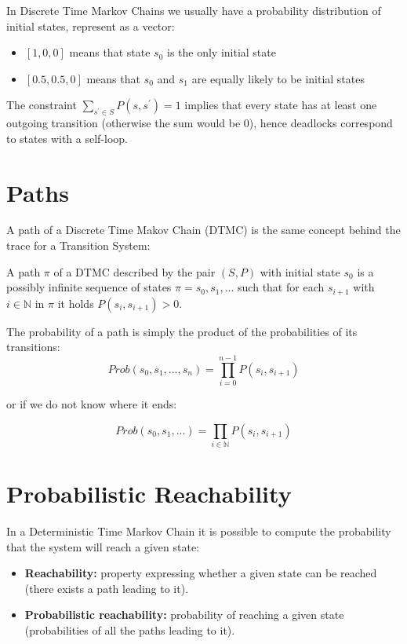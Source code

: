 In Discrete Time Markov Chains we usually have a probability distribution of initial states, represent as a vector:
\begin{itemize}
    \item $[1, 0, 0]$ means that state $s_0$ is the only initial state
    \item $[0.5, 0.5, 0]$ means that $s_{0}$ and $s_{1}$ are equally likely to be initial states
\end{itemize}

The constraint $\sum_{s^{'} \in S} P(s, s^{'}) = 1$ implies that every state has at least one outgoing transition (otherwise the sum would be 0), hence deadlocks correspond to states with a self-loop.

\section{Paths}
A path of a Discrete Time Makov Chain (DTMC) is the same concept behind the trace for a Transition System:\par
A path $\pi$ of a DTMC described by the pair $(S, P)$ with initial state $s_{0}$ is a possibly infinite sequence of states $\pi = s_{0}, s_{1}, ...$ such that for each $s_{i+1}$ with $i \in \mathbb{N}$ in $\pi$ it holds $P(s_{i}, s_{i+1}) > 0$.\par

The probability of a path is simply the product of the probabilities of its transitions:
\begin{equation*}
    Prob(s_{0}, s_{1}, ..., s_{n}) = \prod^{n-1}_{i=0} P(s_{i}, s_{i+1})
\end{equation*}
\begin{center}
    or if we do not know where it ends:
\end{center}
\begin{equation*}
    Prob(s_{0}, s_{1}, ...) = \prod_{i \in \mathbb{N}} P(s_{i}, s_{i+1})
\end{equation*}

\section{Probabilistic Reachability}
In a Deterministic Time Markov Chain it is possible to compute the probability that the system will reach a given state:

\begin{itemize}
    \item \textbf{Reachability:} property expressing whether a given state can be reached (there exists a path leading to it).
    \item \textbf{Probabilistic reachability:} probability of reaching a given state (probabilities of all the paths leading to it).
\end{itemize}


